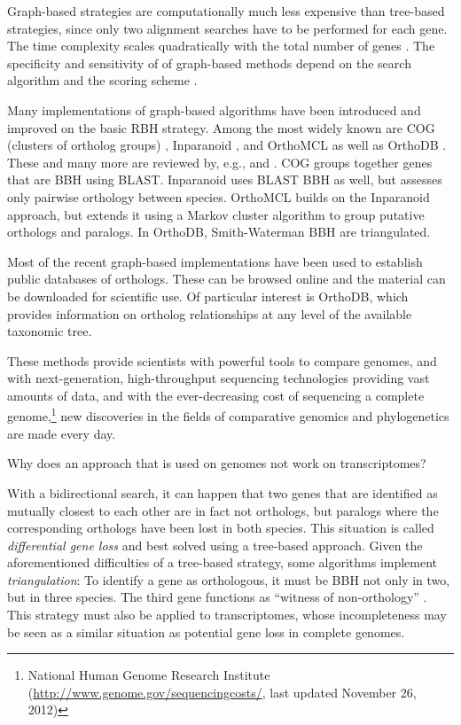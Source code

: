 Graph-based strategies are computationally much less expensive than tree-based
strategies, since only two alignment searches have to be performed for each
gene. The time complexity scales quadratically with the total number of genes
\citep{altenhoff2012-1}. 
The specificity and sensitivity of of graph-based methods depend on the search
algorithm and the scoring scheme \citep{hulsen2006}.

Many implementations of graph-based algorithms have been introduced and improved
on the basic RBH strategy. Among the most widely known are COG (clusters of
ortholog groups) \citep{tatusov2003}, Inparanoid \citep{ostlund2010}, and
OrthoMCL \citep{li2003} as well as OrthoDB \citep{waterhouse2011}. These and
many more are reviewed by, e.g., \citet{kuzniar2008} and \citet{forslund2011}.
COG groups together genes that are BBH using BLAST. Inparanoid uses BLAST BBH as
well, but assesses only pairwise orthology between species. OrthoMCL builds on
the Inparanoid approach, but extends it using a Markov cluster algorithm to
group putative orthologs and paralogs. In OrthoDB, Smith-Waterman BBH are
triangulated.

Most of the recent graph-based implementations have been used to establish
public databases of orthologs. These can be browsed online and the material can
be downloaded for scientific use. Of particular interest is OrthoDB, which
provides information on ortholog relationships at any level of the available
taxonomic tree. 

These methods provide scientists with powerful tools to compare genomes, and
with next-generation, high-throughput sequencing technologies providing vast
amounts of data, and with the ever-decreasing cost of sequencing a complete
genome,\footnote{National Human Genome Research Institute
(\url{http://www.genome.gov/sequencingcosts/}, last updated November 26, 2012)}
new discoveries in the fields of comparative genomics and phylogenetics are made
every day. 

Why does an approach that is used on genomes not work on transcriptomes?

With a bidirectional search, it can happen that two genes that are identified as
mutually closest to each other are in fact not orthologs, but paralogs where the
corresponding orthologs have been lost in both species. This situation is called
\emph{differential gene loss} and best solved using a tree-based approach. Given
the aforementioned difficulties of a tree-based strategy, some algorithms
implement \emph{triangulation}: To identify a gene as orthologous, it must be
BBH not only in two, but in three species. The third gene functions as ``witness
of non-orthology'' \citep{dessimoz2006}. This strategy must also be applied to
transcriptomes, whose incompleteness may be seen as a similar situation as
potential gene loss in complete genomes.
